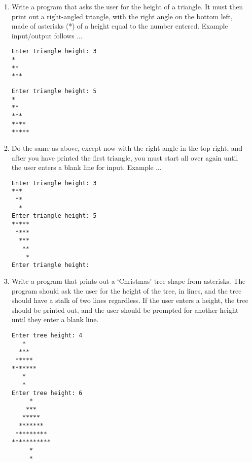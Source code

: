 \begin{enumerate}
	\item Write a program that asks the user for the height of a triangle.    It must then print out a right-angled triangle, with the right angle on the    bottom left, made of asterisks (*) of a height equal to the    number entered. Example input/output follows ...      
\begin{lstlisting}
Enter triangle height: 3
*
**
***
\end{lstlisting}
\begin{lstlisting}
Enter triangle height: 5
*
**
***
****
*****
\end{lstlisting}
	\item Do the same as above, except now with the right angle in the top right, and after you have printed the first triangle, you must start all over again until the user enters a blank line for input. Example ...      
\begin{lstlisting}
Enter triangle height: 3
***
 **
  *
Enter triangle height: 5
*****
 ****
  ***
   **
    *
Enter triangle height: 
\end{lstlisting}
	\item Write a program that prints out a `Christmas' tree shape from    asterisks. The program should ask the user for the height of the    tree, in lines, and the tree should have a stalk of two lines    regardless. If the user enters a height, the tree should be printed    out, and the user should be prompted for another height until they    enter a blank line.     
\begin{lstlisting}
Enter tree height: 4
   *
  ***
 *****
*******
   *
   *
Enter tree height: 6
     *
    ***
   *****
  *******
 *********
***********
     *
     *
\end{lstlisting}
\end{enumerate}    
